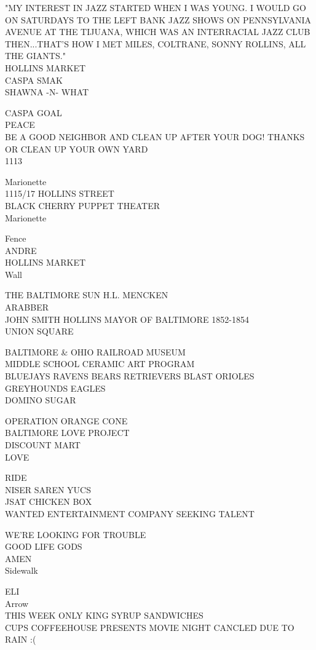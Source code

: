 \documentclass[10pt,letterpaper]{article}
\begin{document}
"MY INTEREST IN JAZZ STARTED WHEN I WAS YOUNG.  I WOULD GO ON SATURDAYS TO THE LEFT BANK JAZZ SHOWS ON PENNSYLVANIA AVENUE AT THE TIJUANA, WHICH WAS AN INTERRACIAL JAZZ CLUB THEN...THAT'S HOW I MET MILES, COLTRANE, SONNY ROLLINS, ALL THE GIANTS."\\
HOLLINS MARKET\\
CASPA SMAK\\
SHAWNA {-}N{-} WHAT

CASPA GOAL\\
PEACE\\
BE A GOOD NEIGHBOR AND CLEAN UP AFTER YOUR DOG! THANKS OR CLEAN UP YOUR OWN YARD\\
1113

Marionette\\
1115/17 HOLLINS STREET\\
BLACK CHERRY PUPPET THEATER\\
Marionette

Fence\\
ANDRE\\
HOLLINS MARKET\\
Wall

THE BALTIMORE SUN H.L. MENCKEN\\
ARABBER\\
JOHN SMITH HOLLINS MAYOR OF BALTIMORE 1852{-}1854\\
UNION SQUARE

BALTIMORE \& OHIO RAILROAD MUSEUM\\
MIDDLE SCHOOL CERAMIC ART PROGRAM\\
BLUEJAYS RAVENS BEARS RETRIEVERS BLAST ORIOLES GREYHOUNDS EAGLES\\
DOMINO SUGAR

OPERATION ORANGE CONE\\
BALTIMORE LOVE PROJECT\\
DISCOUNT MART\\
LOVE

RIDE\\
NISER SAREN YUCS\\
JSAT CHICKEN BOX\\
WANTED ENTERTAINMENT COMPANY SEEKING TALENT

WE'RE LOOKING FOR TROUBLE\\
GOOD LIFE GODS\\
AMEN\\
Sidewalk

ELI\\
Arrow\\
THIS WEEK ONLY KING SYRUP SANDWICHES\\
CUPS COFFEEHOUSE PRESENTS MOVIE NIGHT CANCLED DUE TO RAIN :(
\end{document}

